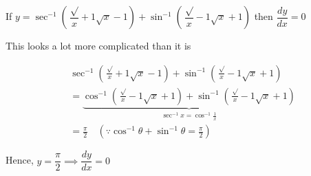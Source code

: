 \documentclass[14pt,fleqn]{extarticle}
\newcommand\nmr{\sqrt{x}-1}
\newcommand\dnm{\sqrt{x}+1}
\begin{document}
 
\begin{snippet}
    \correct
    
    If $y = \sec^{-1} \left(\dfrac\dnm\nmr \right) + \sin^{-1} \left(\dfrac\nmr\dnm \right)$ then $\dfrac{dy}{dx} = 0$ 
    
    \reason
    
    This looks a lot more complicated than it is \newline 
    
    \begin{align}
	 &\sec^{-1} \left(\frac\dnm\nmr \right) + \sin^{-1} \left(\frac\nmr\dnm\right) \\
	 &= \underbrace{\cos^{-1} \left(\frac\nmr\dnm \right) + \sin^{-1} \left(\frac\nmr\dnm \right)}_{\sec^{-1} x = \cos^{-1} \frac{1}{x}} \\
	 &= \frac\pi{2} \quad (\because \cos^{-1}\theta + \sin^{-1}\theta = \frac\pi{2}) 
\end{align}
   
   Hence, $ y = \dfrac\pi{2}\implies \dfrac{dy}{dx}  = 0$
\end{snippet} 
\end{document}
